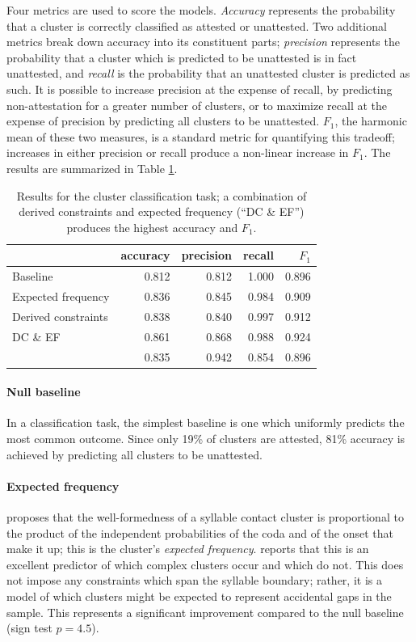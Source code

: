 Four metrics are used to score the models. 
\emph{Accuracy} represents the probability that a cluster is correctly classified as attested or unattested.
Two additional metrics break down accuracy into its constituent parts;
\emph{precision} represents the probability that a cluster which is predicted to be unattested is in fact unattested, and \emph{recall} is the probability that an unattested cluster is predicted as such.
It is possible to increase precision at the expense of recall, by predicting non-attestation for a greater number of clusters, or to maximize recall at the expense of precision by predicting all clusters to be unattested. 
$F_1$, the harmonic mean of these two measures, is a standard metric for quantifying this tradeoff; increases in either precision or recall produce a  non-linear increase in $F_1$. The results are summarized in Table \ref{cmresults}.

\begin{table}
\centering
\begin{tabular}{l | rrrr}
\toprule
                    & accuracy & precision & recall & $F_1$ \\
\midrule
Baseline            & 0.812    & 0.812     & 1.000  & 0.896 \\
Expected frequency  & 0.836    & 0.845     & 0.984  & 0.909 \\
Derived constraints & 0.838    & 0.840     & 0.997  & 0.912 \\
DC \& EF            & 0.861    & 0.868     & 0.988  & 0.924 \\
\citet{Hayes2008a}  & 0.835    & 0.942     & 0.854  & 0.896 \\
\bottomrule
\end{tabular}
\caption{Results for the cluster classification task; a combination of derived constraints and expected frequency (``DC \& EF'') produces the highest accuracy and $F_1$.}
\label{cmresults}
\end{table}

\paragraph{Null baseline} 
In a classification task, the simplest baseline is one which uniformly predicts the most common outcome. 
Since only 19\% of clusters are attested, 
81\% accuracy is achieved by predicting all clusters to be unattested.

\paragraph{Expected frequency} 
\citet{Pierrehumbert1994} proposes that the well-formedness of a syllable contact cluster is proportional to the product of the independent probabilities of the coda and of the onset that make it up; this is the cluster's \emph{expected frequency}. 
\citeauthor{Pierrehumbert1994} reports that this is an excellent predictor of which complex clusters occur and which do not. 
This does not impose any constraints which span the syllable boundary; rather, it is a model of which clusters might be expected to represent accidental gaps in the sample.
This represents a significant improvement compared to the null baseline (sign test $p = 4.5$).

